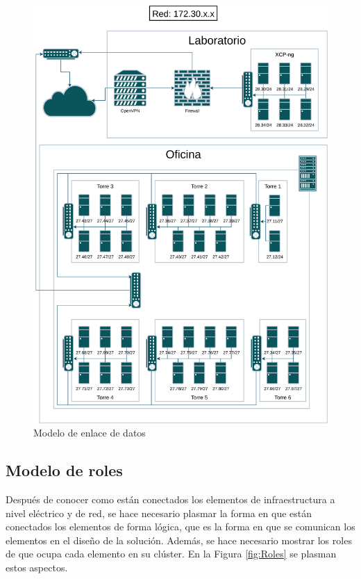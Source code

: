 \begin{figure}[H]
	\centering
	\includegraphics[scale=0.1]{tablas-images/personalizado/Diagramas HTCondor-Enlace.drawio.png}
	\caption{Modelo de enlace de datos}
    \label{fig:Enlace}
\end{figure}

\subsection{Modelo de roles}
\noindent
Después de conocer como están conectados los elementos de infraestructura a nivel eléctrico y de red, se hace necesario plasmar la forma en que están conectados los elementos de forma lógica, que es la forma en que se comunican los elementos en el diseño de la solución. Además, se hace necesario mostrar los roles de \HTCondor que ocupa cada elemento en su clúster. En la Figura \ref{fig:Roles} se plasman estos aspectos.

